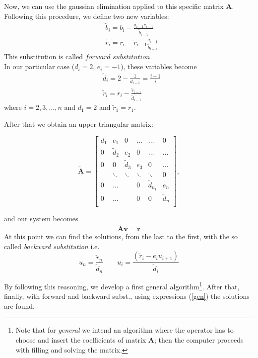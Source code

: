 \documentclass[10pt,showpacs,preprintnumbers,footinbib,amsmath,amssymb,aps,prl,twocolumn,groupedaddress,superscriptaddress,showkeys]{revtex4-1}
\begin{document}
Now, we can use the gaussian elimination applied to this specific matrix $\mathbf{A}$. Following this procedure, we define two new variables:
\begin{equation}
\label{gen}
\begin{split}
&\tilde{b}_{i} = b_i - \frac{a_{i-1}c_{i-1}}{\tilde{b}_{i-1}} \\
&\tilde{r}_i = r_i  - \tilde{r}_{i-1}\frac{a_{i-1}}{\tilde{b}_{i-1}} %
\end{split}
\end{equation}
This substitution is called $\textit{forward substitution}$.\\
In our particular case ($d_i=2$, $e_i=-1$), these variables become
\begin{equation}
\label{spec}
\begin{split}
&\tilde{d}_{i} = 2 - \frac{1}{d_{i-1}} = \frac{i+1}{i} \\
&\tilde{r}_i = r_i  - \frac{\tilde{r}_{i-1}}{\tilde{d}_{i-1}}
\end{split}
\end{equation}
where $i=2,3,\dots,n$ and $d_1 = 2$ and $\tilde{r}_1 = r_1$. 

After that we obtain an upper triangular matrix:  

\begin{equation}
\label{Atilde}
\mathbf{\tilde{A}} =\begin{bmatrix}
d_1& e_1& 0 &\dots   & \dots &0 \\
0 & \tilde{d}_2 & e_2 &0 &\dots &\dots \\
0&0 & \tilde{d}_3 & e_3 & 0 & \dots \\
& \ddots   & \ddots &\ddots   &\ddots & 0 \\
0&\dots   &  &0 &\tilde{d}_{n_1}& e_n \\
0&\dots    &  & 0  &0 & \tilde{d}_n \\
\end{bmatrix},
\end{equation}

and our system becomes \[\mathbf{\tilde{A}}\mathbf{v}=\mathbf{\tilde{r}}\]
At this point we can find the solutions, from the last to the first, with the so called \textit{backward substitution} i.e.
\begin{equation}
u_n=\frac{\tilde{r}_n}{\tilde{d}_n}\qquad u_i=\frac{(\tilde{r}_i-e_iu_{i+1})}{\tilde{d}_i}
\end{equation}


By following this reasoning, we develop a first general algorithm\footnote{Note that for \textit{general} we intend an algorithm where the operator has to choose and insert the coefficients of matrix $\mathbf{A}$; then the computer proceeds with filling and solving the matrix.}. 
After that, finally, with forward and backward subst., using expressions (\ref{gen}) the solutions are found. %
\end{document}
